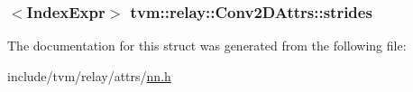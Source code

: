 \subsubsection[{\texorpdfstring{strides}{strides}}]{$<${\bf Index\+Expr}$>$ tvm\+::relay\+::\+Conv2\+D\+Attrs\+::strides}\hypertarget{structtvm_1_1relay_1_1Conv2DAttrs_abae2278ecb5c2ddc80a82f703ccfeff6}{}\label{structtvm_1_1relay_1_1Conv2DAttrs_abae2278ecb5c2ddc80a82f703ccfeff6}


The documentation for this struct was generated from the following file\+:\begin{DoxyCompactItemize}
\item 
include/tvm/relay/attrs/\hyperlink{include_2tvm_2relay_2attrs_2nn_8h}{nn.\+h}\end{DoxyCompactItemize}
